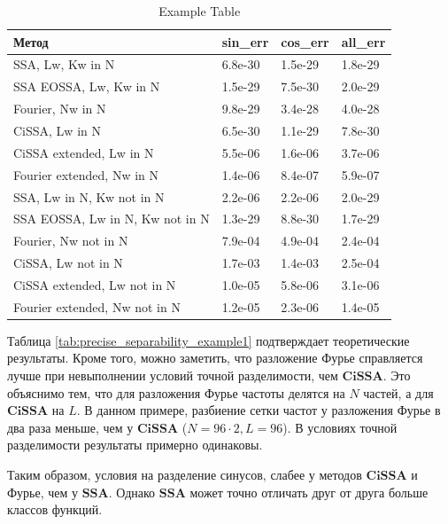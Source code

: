 \documentclass[a4paper, 11pt]{article}
\newcommand{\SSA}{\textbf{SSA}}
\newcommand{\CISSA}{\textbf{CiSSA}}
\begin{document}
\begin{table}[ht]
	\centering
	\begin{tabular}{llll}
	  \hline
	Метод & sin\_err & cos\_err & all\_err \\ 
	  \hline
	SSA, 
	Lw, Kw in N & 6.8e-30 & 1.5e-29 & 1.8e-29 \\ 
	  SSA EOSSA, 
	Lw, Kw in N & 1.5e-29 & 7.5e-30 & 2.0e-29 \\ 
	  Fourier, Nw in N & 9.8e-29 & 3.4e-28 & 4.0e-28 \\ 
	  CiSSA, Lw in N & 6.5e-30 & 1.1e-29 & 7.8e-30 \\ 
	  CiSSA extended, Lw in N & 5.5e-06 & 1.6e-06 & 3.7e-06 \\ 
	  Fourier extended, Nw in N & 1.4e-06 & 8.4e-07 & 5.9e-07 \\ 
	  SSA, 
	Lw in N, Kw not in N & 2.2e-06 & 2.2e-06 & 2.0e-29 \\ 
	  SSA EOSSA, 
	Lw in N, Kw not in N & 1.3e-29 & 8.8e-30 & 1.7e-29 \\ 
	  Fourier, Nw not in N & 7.9e-04 & 4.9e-04 & 2.4e-04 \\ 
	  CiSSA, Lw not in N & 1.7e-03 & 1.4e-03 & 2.5e-04 \\ 
	  CiSSA extended, Lw not in N & 1.0e-05 & 5.8e-06 & 3.1e-06 \\ 
	  Fourier extended, Nw not in N & 1.2e-05 & 2.3e-06 & 1.4e-05 \\ 
	   \hline
	\end{tabular}
	\caption{Example Table} 
	\end{table}

Таблица \ref{tab:precise_separability_example1} подтверждает теоретические результаты. Кроме того, можно заметить, что разложение Фурье справляется лучше при невыполнении условий точной разделимости, чем $\CISSA$. Это объяснимо тем, что для разложения Фурье частоты делятся на $N$ частей, а для $\CISSA$ на $L$. В данном примере, разбиение сетки частот у разложения Фурье в два раза меньше, чем у $\CISSA$ ($N = 96 \cdot 2, L = 96$). В условиях точной разделимости результаты примерно одинаковы.

Таким образом, условия на разделение синусов, слабее у методов $\CISSA$ и Фурье, чем у $\SSA$. Однако $\SSA$ может точно отличать друг от друга больше классов функций.
\end{document}
